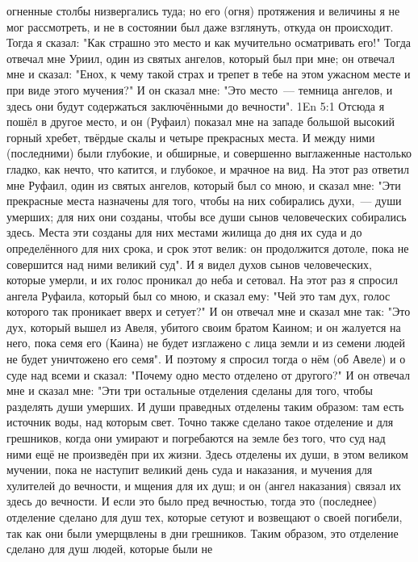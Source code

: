 огненные столбы низвергались туда; но его (огня) протяжения и величины я не мог
рассмотреть, и не в состоянии был даже взглянуть, откуда он происходит.
Тогда я сказал: "Как страшно это место и как мучительно осматривать
его!"
Тогда отвечал мне Уриил, один из святых ангелов, который был при мне;
он отвечал мне и сказал: "Енох, к чему такой страх и трепет в тебе на этом
ужасном месте и при виде этого мучения?"
И он сказал мне: "Это место~--- темница ангелов, и здесь они будут
содержаться заключёнными до вечности".
\vs 1En 5:1
Отсюда я пошёл в другое место, и он (Руфаил) показал мне на
западе большой высокий горный хребет, твёрдые скалы и четыре прекрасных места.
И между ними (последними) были глубокие, и обширные, и совершенно
выглаженные настолько гладко, как нечто, что катится, и глубокое, и мрачное
на вид.
На этот раз ответил мне Руфаил, один из святых ангелов, который был
со мною, и сказал мне: "Эти прекрасные места назначены для того, чтобы на них
собирались духи,~--- души умерших; для них они созданы, чтобы все души сынов
человеческих собирались здесь.
Места эти созданы для них местами жилища до дня их суда и до
определённого для них срока, и срок этот велик: он продолжится дотоле, пока не
совершится над ними великий суд".
И я видел духов сынов человеческих, которые умерли, и их голос
проникал до неба и сетовал.
На этот раз я спросил ангела Руфаила, который был со мною, и сказал
ему: "Чей это там дух, голос которого так проникает вверх и сетует?"
И он отвечал мне и сказал мне так: "Это дух, который вышел из Авеля,
убитого своим братом Каином; и он жалуется на него, пока семя его (Каина) не
будет изглажено с лица земли и из семени людей не будет уничтожено его семя".
И поэтому я спросил тогда о нём (об Авеле) и о суде над всеми и
сказал: "Почему одно место отделено от другого?"
И он отвечал мне и сказал мне: "Эти три остальные отделения сделаны
для того, чтобы разделять души умерших.
И души праведных отделены таким образом: там есть источник воды, над
которым свет.
Точно также сделано такое отделение и для грешников, когда они
умирают и погребаются на земле без того, что суд над ними ещё не произведён при
их жизни.
Здесь отделены их души, в этом великом мучении, пока не наступит
великий день суда и наказания, и мучения для хулителей до вечности, и мщения
для их душ; и он (ангел наказания) связал их здесь до вечности.
И если это было пред вечностью, тогда это (последнее) отделение
сделано для душ тех, которые сетуют и возвещают о своей погибели, так как они
были умерщвлены в дни грешников.
Таким образом, это отделение сделано для душ людей, которые были не
